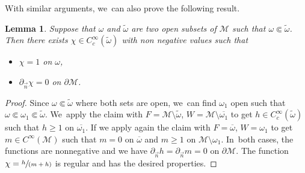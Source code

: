 \documentclass[10pt]{amsart}
\newcommand{\spfrac}[2]{\sfrac{#1}{(#2)}}
\newtheorem{lemma}[theorem]{Lemma}
\theoremstyle{definition}
\let\mc\mathcal
\newcommand{\M}{\mc{M}}
\begin{document}
With similar arguments, we~can also prove the following result.
\begin{lemma}\label{lemma:omomtilde-smaller-subset}
Suppose that $\omega$ and $\widetilde{\omega}$ are two open subsets of $\M$ such that $\omega \Subset \widetilde{\omega}$. Then there exists $\chi\in C^{\infty}_c(\widetilde{\omega})$ with non negative values such that
\begin{itemize}
\item $\chi=1$ on $\omega$,
\item $\partial_{\vec n} \chi=0$ on $\partial \M$.
\end{itemize}
\end{lemma}
\begin{proof}
Since $\omega \Subset \widetilde{\omega}$ where both sets are open, we~can find $\omega_1$ open such that $\omega \Subset \omega_1 \Subset \widetilde{\omega}$. We~apply the claim with $F=\M\setminus \widetilde{\omega}$, $W=\M\setminus \overline{\omega_1}$ to get $h\in C^{\infty}_c(\widetilde{\omega})$ such that $h\geq 1$ on $\overline{\omega_1}$. If we apply again the claim with $F=\overline{\omega}$, $W=\omega_1$ to get $m\in C^{\infty}(\M)$ such that $m=0$ on $\overline{\omega}$ and $m\geq 1$ on $\M\setminus\omega_1$. In~both cases, the functions are nonnegative and we have $\partial_{\vec n} h=\partial_{\vec n} m=0$ on $\partial \M$. The function $\chi=\spfrac{h}{m+h}$ is regular and has the desired properties.
\end{proof}
\end{document}
